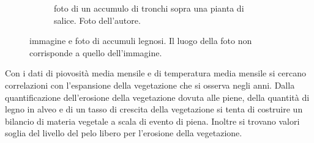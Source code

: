 \begin{figure}
\begin{subfigure}[b]{0.44\textwidth}
		\caption{foto di un accumulo di tronchi sopra una pianta di salice.
		Foto dell'autore.}
		\label{fig:esempio-accumulo-1}
	\end{subfigure}
	\caption[immagine e foto di accumuli legnosi]{immagine e foto di accumuli legnosi. Il luogo della foto non corrisponde a quello dell'immagine.}
\end{figure}

Con i dati di piovosità media mensile e di temperatura media mensile si cercano correlazioni con l'espansione della vegetazione che si osserva negli anni.
Dalla quantificazione dell'erosione della vegetazione dovuta alle piene, della quantità di legno in alveo e di un tasso di crescita della vegetazione si tenta di costruire un bilancio di materia vegetale a scala di evento di piena.
Inoltre si trovano valori soglia del livello del pelo libero per l'erosione della vegetazione.

